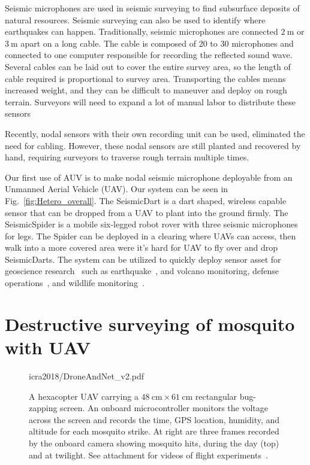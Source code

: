 Seismic microphones are used in seismic surveying to find subsurface deposits of natural resources.
Seismic surveying can also be used to identify where earthquakes can happen.
Traditionally, seismic microphones are connected $\SI{2}{\metre}$ or $\SI{3}{\metre}$ apart on a long cable.
The cable is composed of 20 to 30 microphones and connected to one computer responsible for recording the reflected sound wave.
Several cables can be laid out to cover the entire survey area, so the length of cable required is proportional to survey area.
Transporting the cables means increased weight, and they can be difficult to maneuver and deploy on rough terrain.
Surveyors will need to expand a lot of manual labor to distribute these sensors

Recently, nodal sensors with their own recording unit can be used, eliminated the need for cabling.
However, these nodal sensors are still planted and recovered by hand, requiring surveyors to traverse rough terrain multiple times.

Our first use of AUV is to make nodal seismic microphone deployable from an Unmanned Aerial Vehicle (UAV).
Our system can be seen in Fig.~\ref{fig:Hetero_overall}.
The SeismicDart is a dart shaped, wireless capable sensor that can be dropped from a UAV to plant into the ground firmly.
The SeismicSpider is a mobile six-legged robot rover with three seismic microphones for legs.
The Spider can be deployed in a clearing where UAVs can access, then walk into a more covered area were it's hard for UAV to fly over and drop SeismicDarts.
The system can be utilized to quickly deploy sensor asset for geoscience research~\cite{werner2006deploying} such as
earthquake~\cite{dominici2012micro},
and volcano \cite{nagatani2013volcanic} monitoring,
defense operations~\cite{wu2007efficient},
and wildlife monitoring~\cite{dyo2010evolution,mainwaring2002wireless}. 

\section[Mosquito AUV]{Destructive surveying of mosquito with UAV}

\begin{figure}
	\centering
	\begin{overpic}[width=1\columnwidth]{icra2018/DroneAndNet_v2.pdf}\end{overpic}
	\caption{\label{fig:DroneAndNet}
		A hexacopter UAV carrying a $\SI{48}{\centi\metre} \times \SI{61}{\centi\metre}$ rectangular bug-zapping screen.
		An onboard microcontroller monitors the voltage across the screen and records the time, GPS location, humidity, and altitude for each mosquito strike.
		At right are three frames recorded by the onboard camera showing mosquito hits, during the day (top) and at twilight.
		See attachment for videos of flight experiments~\cite{Bhatnagar2018}.
	\vspace{-2em}
	}
\end{figure}

